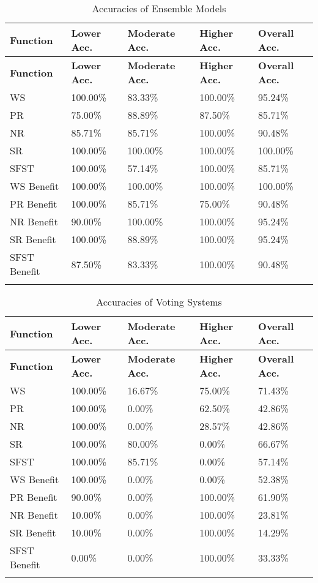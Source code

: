 \documentclass[12pt,letterpaper]{article}
\begin{document}
\begin{longtable}{|p{3cm}|p{2.5cm}|p{2.5cm}|p{2.5cm}|p{2.5cm}|}
\hline
\textbf{Function} & \textbf{Lower Acc.} & \textbf{Moderate Acc.} & \textbf{Higher Acc.} & \textbf{Overall Acc.} \\ \hline
\endfirsthead
\hline
\textbf{Function} & \textbf{Lower Acc.} & \textbf{Moderate Acc.} & \textbf{Higher Acc.} & \textbf{Overall Acc.} \\ \hline
\endhead

WS & 100.00\% & 83.33\% & 100.00\% & 95.24\% \\ \hline
PR & 75.00\% & 88.89\% & 87.50\% & 85.71\% \\ \hline
NR & 85.71\% & 85.71\% & 100.00\% & 90.48\% \\ \hline
SR & 100.00\% & 100.00\% & 100.00\% & 100.00\% \\ \hline
SFST & 100.00\% & 57.14\% & 100.00\% & 85.71\% \\ \hline
WS Benefit & 100.00\% & 100.00\% & 100.00\% & 100.00\% \\ \hline
PR Benefit & 100.00\% & 85.71\% & 75.00\% & 90.48\% \\ \hline
NR Benefit & 90.00\% & 100.00\% & 100.00\% & 95.24\% \\ \hline
SR Benefit & 100.00\% & 88.89\% & 100.00\% & 95.24\% \\ \hline
SFST Benefit & 87.50\% & 83.33\% & 100.00\% & 90.48\% \\ \hline

\caption{Accuracies of Ensemble Models}
\label{tab:grouping_2}
\end{longtable}

\begin{longtable}{|p{3cm}|p{2.5cm}|p{2.5cm}|p{2.5cm}|p{2.5cm}|}
\hline
\textbf{Function} & \textbf{Lower Acc.} & \textbf{Moderate Acc.} & \textbf{Higher Acc.} & \textbf{Overall Acc.} \\ \hline
\endfirsthead
\hline
\textbf{Function} & \textbf{Lower Acc.} & \textbf{Moderate Acc.} & \textbf{Higher Acc.} & \textbf{Overall Acc.} \\ \hline
\endhead

WS & 100.00\% & 16.67\% & 75.00\% & 71.43\% \\ \hline
PR & 100.00\% & 0.00\% & 62.50\% & 42.86\% \\ \hline
NR & 100.00\% & 0.00\% & 28.57\% & 42.86\% \\ \hline
SR & 100.00\% & 80.00\% & 0.00\% & 66.67\% \\ \hline
SFST & 100.00\% & 85.71\% & 0.00\% & 57.14\% \\ \hline
WS Benefit & 100.00\% & 0.00\% & 0.00\% & 52.38\% \\ \hline
PR Benefit & 90.00\% & 0.00\% & 100.00\% & 61.90\% \\ \hline
NR Benefit & 10.00\% & 0.00\% & 100.00\% & 23.81\% \\ \hline
SR Benefit & 10.00\% & 0.00\% & 100.00\% & 14.29\% \\ \hline
SFST Benefit & 0.00\% & 0.00\% & 100.00\% & 33.33\% \\ \hline

\caption{Accuracies of Voting Systems}
\label{tab:grouping_3}
\end{longtable}
\end{document}
